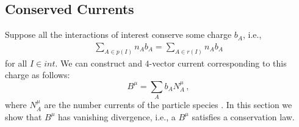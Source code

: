 \subsection{Conserved Currents}
Suppose all the interactions of interest conserve some charge $b_A$, i.e.,
 \begin{align}\label{eq:conserved_charge}
\sum_{A\in p(I)} n_Ab_A=\sum_{A\in r(I)} n_Ab_A
\end{align}
for all $I\in int$.   We can construct and $4$-vector current corresponding to this charge as follows:
\begin{equation}
B^\mu=\sum_A b_A N_A^\mu\,,
\end{equation}
where $N^\mu_A$ are the number currents of the particle species .  In this section we show that $B^\mu$ has vanishing divergence,  i.e., a $B^\mu$ satisfies a conservation law.

